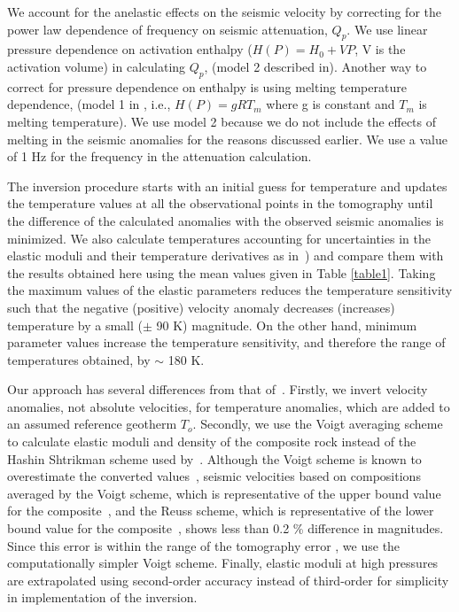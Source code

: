 \documentclass[draft,linenumbers]{agujournal2018}
\begin{document}
We account for the anelastic effects on the seismic velocity by correcting for the power law dependence of frequency on seismic attenuation, $Q_p$. We use linear pressure dependence on activation enthalpy ($H(P)= H_0 + VP$, V is the activation volume) in calculating $Q_p$, (model 2 described in\citet{sobolev1996upper}). Another way to correct for pressure dependence on enthalpy is using melting temperature dependence, (model 1 in \citet{sobolev1996upper}, i.e., $H(P)= gRT_m$ where g is constant and $T_m$ is melting temperature). We use model 2 because we do not include the effects of melting in the seismic anomalies for the reasons discussed earlier. We use a value of 1 Hz for the frequency in the attenuation calculation.

The inversion procedure starts with an initial guess for temperature and updates the temperature values at all the observational points in the tomography until the difference of the calculated anomalies with the observed seismic anomalies is minimized. We also calculate temperatures accounting for uncertainties in the elastic moduli and their temperature derivatives as in~\citep{Cammarano2003}) and compare them with the results obtained here using the mean values given in Table \ref{table1}. Taking the maximum values of the elastic parameters reduces the temperature sensitivity such that the negative (positive) velocity anomaly decreases (increases) temperature by a small ($\pm$ 90 K) magnitude. On the other hand, minimum parameter values increase the temperature sensitivity, and therefore the range of temperatures obtained, by $\sim$ 180 K.

Our approach has several differences from that of~\citet{Cammarano2003}. Firstly, we invert velocity anomalies, not absolute velocities, for temperature anomalies, which are added to an assumed reference geotherm $T_o$. Secondly, we use the Voigt averaging scheme to calculate elastic moduli and density of the composite rock instead of the Hashin Shtrikman scheme used by~\citet{Cammarano2003}. Although the Voigt scheme is known to overestimate the converted values~\citep{watt_1976}, seismic velocities based on compositions averaged by the Voigt scheme, which is representative of the upper bound value for the composite~\citep{watt_1976}, and the Reuss scheme, which is representative of the  lower bound value for the composite~\citep{watt_1976}, shows less than 0.2 \% difference in magnitudes. Since this error is within the range of the tomography error \citep{Biryol_2016}, we use the computationally simpler Voigt scheme. Finally, elastic moduli at high pressures are extrapolated using second-order accuracy instead of third-order for simplicity in implementation of the inversion.
\end{document}
